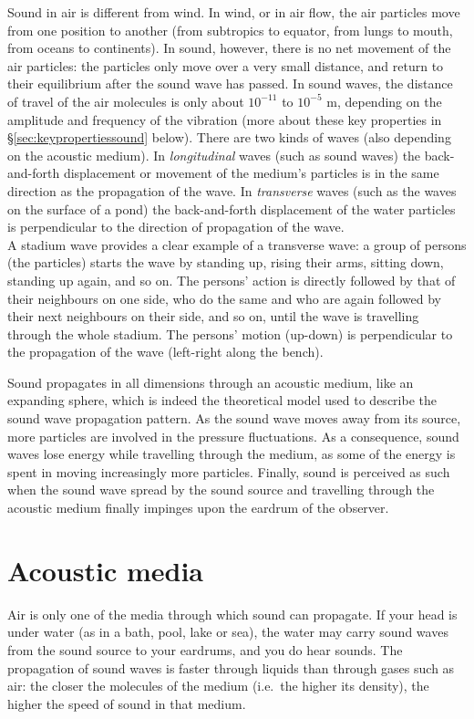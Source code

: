 \documentclass[
]{book}
\begin{document}
Sound in air is different from wind. In wind, or in air flow, the air particles move from one position to another (from subtropics to equator, from lungs to mouth, from oceans to continents). In sound, however, there is no net movement of the air particles: the particles only move over a very small distance, and return to their equilibrium after the sound wave has passed. In sound waves, the distance of travel of the air molecules is only about \(10^{-11}\) to \(10^{-5}\) m, depending on the amplitude and frequency of the vibration (more about these key properties in §\ref{sec:keypropertiessound} below).
There are two kinds of waves (also depending on the acoustic medium). In \emph{longitudinal} waves (such as sound waves) the back-and-forth displacement or movement of the medium's particles is in the same direction as the propagation of the wave. In \emph{transverse} waves (such as the waves on the surface of a pond) the back-and-forth displacement of the water particles is perpendicular to the direction of propagation of the wave.\\
A stadium wave provides a clear example of a transverse wave: a group of persons (the particles) starts the wave by standing up, rising their arms, sitting down, standing up again, and so on. The persons' action is directly followed by that of their neighbours on one side, who do the same and who are again followed by their next neighbours on their side, and so on, until the wave is travelling through the whole stadium. The persons' motion (up-down) is perpendicular to the propagation of the wave (left-right along the bench).

Sound propagates in all dimensions through an acoustic medium, like an expanding sphere, which is indeed the theoretical model used to describe the sound wave propagation pattern. As the sound wave moves away from its source, more particles are involved in the pressure fluctuations. As a consequence, sound waves lose energy while travelling through the medium, as some of the energy is spent in moving increasingly more particles. Finally, sound is perceived as such when the sound wave spread by the sound source and travelling through the acoustic medium finally impinges upon the eardrum of the observer.

\section{Acoustic media}\label{acoustic-media}

Air is only one of the media through which sound can propagate. If your head is under water (as in a bath, pool, lake or sea), the water may carry sound waves from the sound source to your eardrums, and you do hear sounds. The propagation of sound waves is faster through liquids than through gases such as air: the closer the molecules of the medium (i.e.~the higher its density), the higher the speed of sound in that medium.
\end{document}
